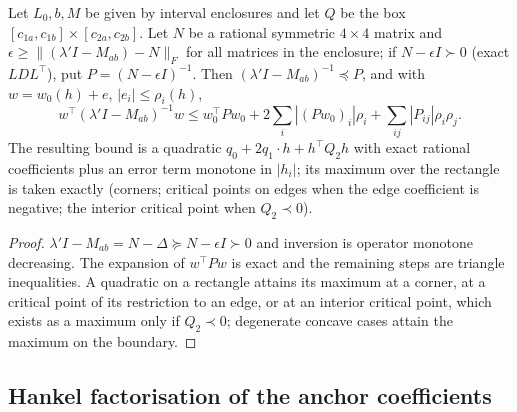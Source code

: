 \begin{lemma}\label{tdb-lem:box}
Let $L_0,b,M$ be given by interval enclosures and let $Q$ be the box $[c_{1a},c_{1b}]\times[c_{2a},c_{2b}]$. Let $N$ be a rational symmetric
$4\times4$ matrix and $\epsilon\ge\|(\lambda'I-M_{ab})-N\|_F$ for all matrices in the enclosure; if $N-\epsilon I\succ0$ (exact $LDL^\top$),
put $P=(N-\epsilon I)^{-1}$. Then $(\lambda'I-M_{ab})^{-1}\preceq P$, and with $w=w_0(h)+e$, $|e_i|\le\rho_i(h)$,
\[
w^\top(\lambda'I-M_{ab})^{-1}w\le w_0^\top Pw_0+2\textstyle\sum_i|(Pw_0)_i|\rho_i+\sum_{ij}|P_{ij}|\rho_i\rho_j .
\]
The resulting bound is a quadratic $q_0+2q_1\cdot h+h^\top Q_2h$ with exact rational coefficients plus an error term monotone in $|h_i|$;
its maximum over the rectangle is taken exactly (corners; critical points on edges when the edge coefficient is negative; the interior
critical point when $Q_2\prec0$).
\end{lemma}
\begin{proof}
$\lambda'I-M_{ab}=N-\Delta\succeq N-\epsilon I\succ0$ and inversion is operator monotone decreasing. The expansion of $w^\top Pw$ is exact
and the remaining steps are triangle inequalities. A quadratic on a rectangle attains its maximum at a corner, at a critical point of
its restriction to an edge, or at an interior critical point, which exists as a maximum only if $Q_2\prec0$; degenerate concave cases
attain the maximum on the boundary.
\end{proof}

\subsection{Hankel factorisation of the anchor coefficients}

